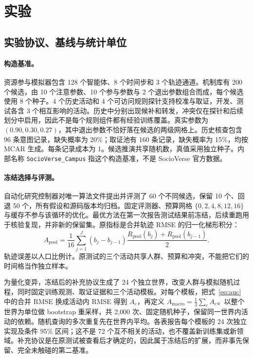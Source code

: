 \section{实验}
\label{sec:experiments}
\subsection{实验协议、基线与统计单位}
\paragraph{构造基准。}
资源参与模拟器包含 128 个智能体、8 个时间步和 3 个轨迹通道。机制库有 200 个候选，由 10 个注意参数、10 个参与参数与 2 个退出参数组合而成，每个候选使用 8 个种子。4 个历史活动和 4 个可访问规则探针支持校准与取证，开发、测试各含 3 个相互影响的活动。历史中分别出现候补和转发，冲突仅在探针和后续划分中启用，因此不是每个规则组件都有经验训练覆盖。真实参数为 $(0.90,0.30,0.27)$，其中退出参数不恰好落在候选的两级网格上。历史核查包含 96 条意图记录，缺失概率为 20\%；取证池有 160 条记录，缺失概率为 15\%，均按 MCAR 生成。每条记录成本为 1。候选推演共享随机数，真值采用独立种子。内部名称 \texttt{SocioVerse\_Campus} 指这个构造基准，不是 SocioVerse 官方数据。

\paragraph{冻结选择与评测。}
自动化研究控制器对唯一算法文件提出并评测了 60 个不同候选，保留 10 个、回退 50 个，所有假设和源码版本均归档。固定评测器、预算网格 $\{0,2,4,8,12,16\}$ 与缓存不参与该循环的优化。最优方法在第一次报告测试结果前冻结，后续重跑用于核验复现，并非新的保留集。原指标是合并轨迹 RMSE 的归一化梯形积分：
\begin{equation}
 A_{\mathrm{pool}}=\frac1{16}\sum_{j=1}^{J}
 (b_j-b_{j-1})\frac{R_{\mathrm{pool}}(b_j)+R_{\mathrm{pool}}(b_{j-1})}{2}.
 \label{eq:auc}
\end{equation}
轨迹误差以人口比例计。原测试的三个活动共享人群、预算和冲突，不能把它们的时间格当作独立样本。

为量化变异，冻结后的补充协议生成了 24 个独立世界，改变人群与模拟随机过程，同时固定训练观测、取证证据和三个活动模板。对每个模板，把式~\eqref{eq:auc} 中的合并 RMSE 换成活动内 RMSE 得到 $A_e$，再定义 $A_{\mathrm{macro}}=\frac13\sum_eA_e$。以整个世界为单位做 bootstrap 重采样，共 2,000 次、固定随机种子，保留同一世界内活动的依赖。随机查询的多次重复先在世界内平均。各表报告每个模板的 24 次独立实现及条件 95\% 区间；这不是 72 个互不相关的活动，也不覆盖新训练集或新领域。补充协议是在原测试被查看后才确定的，因此属于冻结后的扩展，而非事先保留、完全未触碰的第二基准。

